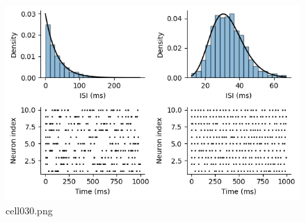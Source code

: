 \begin{figure}[ht]
	\centering
	\includegraphics[scale=0.8, max width=\linewidth]{./fig/neuron-model/isi/cell030.png}
	\caption{cell030.png}
	\label{cell030.png}
\end{figure}